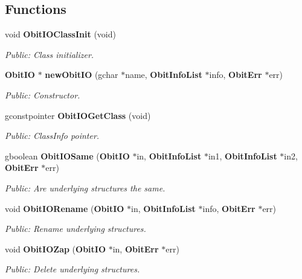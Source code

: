 \subsection*{Functions}
\begin{CompactItemize}
\item 
void {\bf Obit\-IOClass\-Init} (void)
\begin{CompactList}\small\item\em Public: Class initializer. \item\end{CompactList}\item 
{\bf Obit\-IO} $\ast$ {\bf new\-Obit\-IO} (gchar $\ast$name, {\bf Obit\-Info\-List} $\ast$info, {\bf Obit\-Err} $\ast$err)
\begin{CompactList}\small\item\em Public: Constructor. \item\end{CompactList}\item 
gconstpointer {\bf Obit\-IOGet\-Class} (void)
\begin{CompactList}\small\item\em Public: Class\-Info pointer. \item\end{CompactList}\item 
gboolean {\bf Obit\-IOSame} ({\bf Obit\-IO} $\ast$in, {\bf Obit\-Info\-List} $\ast$in1, {\bf Obit\-Info\-List} $\ast$in2, {\bf Obit\-Err} $\ast$err)
\begin{CompactList}\small\item\em Public: Are underlying structures the same. \item\end{CompactList}\item 
void {\bf Obit\-IORename} ({\bf Obit\-IO} $\ast$in, {\bf Obit\-Info\-List} $\ast$info, {\bf Obit\-Err} $\ast$err)
\begin{CompactList}\small\item\em Public: Rename underlying structures. \item\end{CompactList}\item 
void {\bf Obit\-IOZap} ({\bf Obit\-IO} $\ast$in, {\bf Obit\-Err} $\ast$err)
\begin{CompactList}\small\item\em Public: Delete underlying structures. \item\end{CompactList}\item 

\end{CompactItemize}
